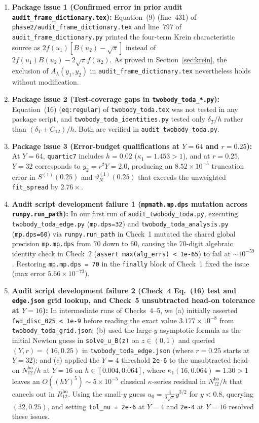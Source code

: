 \documentclass[11pt,a4paper]{article}
\begin{document}
\begin{enumerate}[leftmargin=2em]
  \item \textbf{Package issue 1 (Confirmed error in prior audit \texttt{audit\_frame\_dictionary.tex}):}
  Equation~(9) (line~431) of \texttt{phase2/audit\_frame\_dictionary.tex} and line~797 of \texttt{audit\_frame\_dictionary.py} printed the four-term Krein characteristic source as $2f(u_1)[B(u_2)-\sqrt{\pi}]$ instead of $2f(u_1)B(u_2)-2\sqrt{\pi}f(u_2)$. As proved in Section~\ref{sec:krein}, the exclusion of $A_\lambda(y_1,y_2)$ in \texttt{audit\_frame\_dictionary.tex} nevertheless holds without modification.
  \item \textbf{Package issue 2 (Test-coverage gaps in \texttt{twobody\_toda\_*.py}):}
  Equation~(16) (\texttt{eq:regular}) of \texttt{twobody\_toda.tex} was not tested in any package script, and \texttt{twobody\_toda\_identities.py} tested only $\delta_T/h$ rather than $(\delta_T+C_{12})/h$. Both are verified in \texttt{audit\_twobody\_toda.py}.
  \item \textbf{Package issue 3 (Error-budget qualifications at $Y=64$ and $r=0.25$):}
  At $Y=64$, \texttt{quartic7} includes $h=0.02$ ($\kappa_1=1.453>1$), and at $r=0.25$, $Y=32$ corresponds to $y_2=r^2Y=2.0$, producing an $8.52\times 10^{-5}$ truncation error in $S^{(1)}(0.25)$ and $\vartheta_N^{(1)}(0.25)$ that exceeds the unweighted \texttt{fit\_spread} by $2.76\times$.
  \item \textbf{Audit script development failure 1 (\texttt{mpmath.mp.dps} mutation across \texttt{runpy.run\_path}):}
  In our first run of \texttt{audit\_twobody\_toda.py}, executing \texttt{twobody\_toda\_edge.py} (\texttt{mp.dps=32}) and \texttt{twobody\_toda\_analysis.py} (\texttt{mp.dps=60}) via \texttt{runpy.run\_path} in Check~1 mutated the shared global precision \texttt{mp.mp.dps} from $70$ down to $60$, causing the 70-digit algebraic identity check in Check~2 (\texttt{assert max(alg\_errs) < 1e-65}) to fail at $\sim 10^{-59}$. Restoring \texttt{mp.mp.dps = 70} in the \texttt{finally} block of Check~1 fixed the issue (max error $5.66\times 10^{-73}$).
  \item \textbf{Audit script development failure 2 (Check~4 Eq.~(16) test and \texttt{edge.json} grid lookup, and Check~5 unsubtracted head-on tolerance at $Y=16$):}
  In intermediate runs of Checks~4--5, we (a) initially asserted \texttt{fwd\_disc\_025 < 1e-9} before reading the exact value $3.177\times 10^{-8}$ from \texttt{twobody\_toda\_grid.json}; (b) used the large-$y$ asymptotic formula as the initial Newton guess in \texttt{solve\_u\_B(z)} on $z\in(0,1)$ and queried $(Y,r)=(16,0.25)$ in \texttt{twobody\_toda\_edge.json} (where $r=0.25$ starts at $Y=32$); and (c) applied the $Y=4$ threshold \texttt{2e-6} to the unsubtracted head-on $N_{12}^{\mathrm{ho}}/h$ at $Y=16$ on $h\in[0.004,0.064]$, where $\kappa_1(16,0.064)=1.30>1$ leaves an $O((hY)^5)\sim 5\times 10^{-5}$ classical $\kappa$-series residual in $N_{12}^{\mathrm{ho}}/h$ that cancels out in $R_{12}^{\mathrm{ho}}$. Using the small-$y$ guess $u_0=\frac{4}{3\sqrt{\pi}}y^{3/2}$ for $y<0.8$, querying $(32,0.25)$, and setting \texttt{tol\_nu = 2e-6} at $Y=4$ and \texttt{2e-4} at $Y=16$ resolved these issues.
\end{enumerate}
\end{document}

